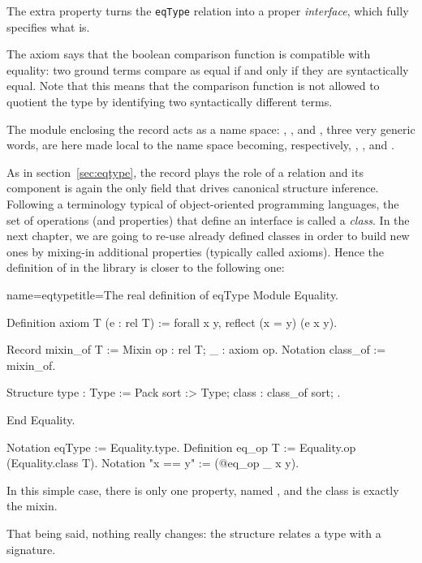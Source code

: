 The extra property turns the
\lstinline/eqType/ relation into a proper \emph{interface},
which fully specifies what  is.

The axiom says that the boolean comparison function
is compatible with equality: two ground terms compare as equal if and
only if they are syntactically equal.  Note that this means that the
comparison function is not allowed to quotient the type by identifying
two syntactically different terms.


The  module enclosing the record acts as a name space:
, ,
 and , three very generic words, are here
made local to the  name space becoming, respectively,
, ,  and .

As in section~\ref{sec:eqtype}, the record plays the role of
a relation and its  component is again the only field
that drives canonical structure inference. Following
a terminology typical of object-oriented programming languages,
the set of operations (and properties) that define an interface is
called a \emph{class}.  In the next chapter, we are going to re-use already
defined classes in order to build new ones by mixing-in additional
properties (typically called axioms).
Hence the definition of  in the
\mcbMC{} library is closer to the following one:

\begin{coq}{name=eqtype}{title=The real definition of eqType}
Module Equality.

Definition axiom T (e : rel T) := forall x y, reflect (x = y) (e x y).

Record mixin_of T := Mixin {op : rel T; _ : axiom op}.
Notation class_of := mixin_of.

Structure type : Type := Pack {sort :> Type; class : class_of sort; }.

End Equality.

Notation eqType := Equality.type.
Definition eq_op T := Equality.op (Equality.class T).
Notation "x == y" := (@eq_op _ x y).
\end{coq}

In this simple case, there is only one property, named
, and the class is exactly the mixin.

That being said, nothing really changes: the  structure
relates a type with a signature.

